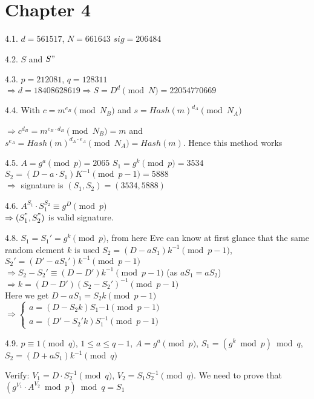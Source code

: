 \section{Chapter 4}

4.1.	 $d = 561517$, $N=661643$
		 $sig = 206484$
	


4.2. $S$ and $S"$


4.3. $p = 212081$, $q=128311$ \\ $\Rightarrow d = 18408628619 \Rightarrow S = D^d \pmod N = 22054770669$


4.4. With $c = m^{e_B} \pmod{N_B}$ and $s = Hash(m)^{d_A} \pmod{N_A}$

$\Rightarrow c^{d_B} = m^{e_B\cdot d_B} \pmod{N_B} = m$ and $s^{e_A} = Hash(m)^{d_A \cdot e_A} \pmod{N_A} = Hash(m)$. Hence this method works


4.5.
		 $A = g^a \pmod p = 2065$
		 $S_1 = g^k \pmod p = 3534$ \\ $S_2 = (D-a\cdot S_1)K^{-1} \pmod{p-1} = 5888$ \\ $\Rightarrow$ signature is $(S_1, S_2) = (3534, 5888)$
	


4.6. $A^{S_1} \cdot S_1^{S_2} \equiv g^D \pmod p$ \\ $\Rightarrow (S_1^", S_2^")$ is valid signature.


4.8.
		 $S_1 = S_1' = g^k \pmod p$, from here Eve can know at first glance that the same random element $k$ is used
		 $S_2 = (D-aS_1)k^{-1} \pmod{p-1}$, $S_2' = (D'-aS_1')k^{-1} \pmod{p-1}$ \\ $\Rightarrow S_2 - S_2' \equiv (D - D')k^{-1} \pmod{p-1}$ (as $aS_1 = aS_2$) \\ $\Rightarrow k = (D-D')(S_2-S_2')^{-1} \pmod{p-1}$ \\ Here we get $D - aS_1 = S_2 k \pmod{p-1}$ \\ $\Rightarrow \begin{cases}
			a = (D - S_2 k) S_1{-1} \pmod{p-1} \\ a = (D'-S_2' k) S_1^{-1} \pmod{p-1}
		\end{cases}$
	


4.9. $p \equiv 1 \pmod q$, $1 \leq a \leq q-1$, $A=g^a \pmod p$, $S_1 = (g^k \bmod p) \bmod q$, $S_2 = (D + aS_1) k^{-1} \pmod q$
	
	Verify: $V_1 = D \cdot S_2^{-1} \pmod q$, $V_2 = S_1 S_2^{-1} \pmod q$. We need to prove that $(g^{V_1} \cdot A^{V_2} \bmod p) \bmod q = S_1$
	
